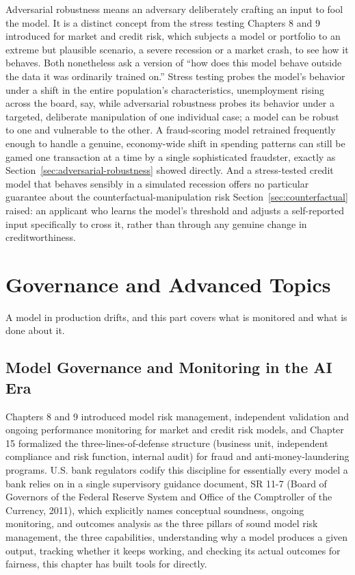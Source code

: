 \documentclass[../ai_in_finance]{subfiles}
\begin{document}
Adversarial robustness means an adversary deliberately crafting an input to fool the model. It is a distinct concept from the stress testing Chapters 8 and 9 introduced for market and credit risk, which subjects a model or portfolio to an extreme but plausible scenario, a severe recession or a market crash, to see how it behaves. Both nonetheless ask a version of ``how does this model behave outside the data it was ordinarily trained on.'' Stress testing probes the model's behavior under a shift in the entire population's characteristics, unemployment rising across the board, say, while adversarial robustness probes its behavior under a targeted, deliberate manipulation of one individual case; a model can be robust to one and vulnerable to the other. A fraud-scoring model retrained frequently enough to handle a genuine, economy-wide shift in spending patterns can still be gamed one transaction at a time by a single sophisticated fraudster, exactly as Section~\ref{sec:adversarial-robustness} showed directly. And a stress-tested credit model that behaves sensibly in a simulated recession offers no particular guarantee about the counterfactual-manipulation risk Section~\ref{sec:counterfactual} raised: an applicant who learns the model's threshold and adjusts a self-reported input specifically to cross it, rather than through any genuine change in creditworthiness.

\section{Governance and Advanced Topics}

A model in production drifts, and this part covers what is monitored and what is done about it.

\subsection{Model Governance and Monitoring in the AI Era}
\label{sec:governance-monitoring}

Chapters 8 and 9 introduced model risk management, independent validation and ongoing performance monitoring for market and credit risk models, and Chapter 15 formalized the three-lines-of-defense structure (business unit, independent compliance and risk function, internal audit) for fraud and anti-money-laundering programs. U.S. bank regulators codify this discipline for essentially every model a bank relies on in a single supervisory guidance document, SR 11-7 (Board of Governors of the Federal Reserve System and Office of the Comptroller of the Currency, 2011), which explicitly names conceptual soundness, ongoing monitoring, and outcomes analysis as the three pillars of sound model risk management, the three capabilities, understanding why a model produces a given output, tracking whether it keeps working, and checking its actual outcomes for fairness, this chapter has built tools for directly.
\end{document}
